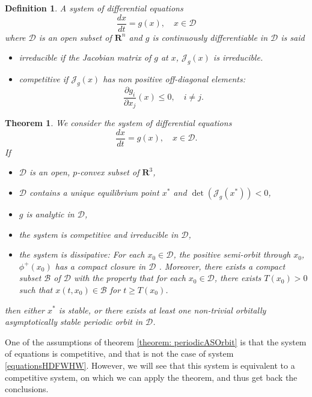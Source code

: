 \documentclass{article}
\newtheorem{theorem}{Theorem}
\newtheorem{definition}{Definition}
\begin{document}
\begin{definition}\cite{smith_monotone_1995}
A system of differential equations
$$ \dfrac{d x}{dt} = g(x), \quad x \in \mathcal{D}$$
where $\mathcal{D}$ is an open subset of $\mathbf{R}^n$ and $g$ is continuously differentiable in $\mathcal{D}$ is said 

\begin{itemize}
\item irreducible if the Jacobian matrix of $g$ at $x$, $\mathcal{J}_g(x)$ is irreducible.
\item competitive if $\mathcal{J}_g(x)$ has non positive off-diagonal elements:
$$ \dfrac{\partial g_i}{\partial x_j}(x) \leq 0, \quad i \neq j.
$$
\end{itemize}

\end{definition}



\begin{theorem}\cite{zhu_stable_1994}\label{theorem: periodicASOrbit}
We consider the system of differential equations
$$
\dfrac{dx}{dt} = g(x), \quad x \in \mathcal{D}.
$$
If
\begin{itemize}
\item $\mathcal{D}$ is an open, $p$-convex subset of $\mathbf{R}^3$,
\item $\mathcal{D}$ contains a unique equilibrium point $x^*$ and $\det(\mathcal{J}_g(x^*)) < 0$,
\item $g$ is analytic in $\mathcal{D}$,
\item the system is competitive and irreducible in $\mathcal{D}$,
\item the system is dissipative: For each $x_0 \in \mathcal{D}$, the positive semi-orbit through $x_0$, $\phi^+(x_0)$ has a compact closure in $\mathcal{D}$ . Moreover, there exists a compact subset $\mathcal{B}$ of $\mathcal{D}$ with the property that for each $x_0 \in \mathcal{D}$, there exists $T(x_0) > 0$ such that $x(t, x_0) \in \mathcal{B}$ for $t \geq T(x_0)$.
\end{itemize}

then either $x^*$ is stable, or there exists at least one non-trivial orbitally asymptotically stable  periodic orbit in $\mathcal{D}$.
\end{theorem}

One of the assumptions of theorem \eqref{theorem: periodicASOrbit} is that the system of equations is competitive, and that is not the case of system \eqref{equationsHDFWHW}. However, we will see that this system is equivalent to a competitive system, on which we can apply the theorem, and thus get back the conclusions.
\end{document}
